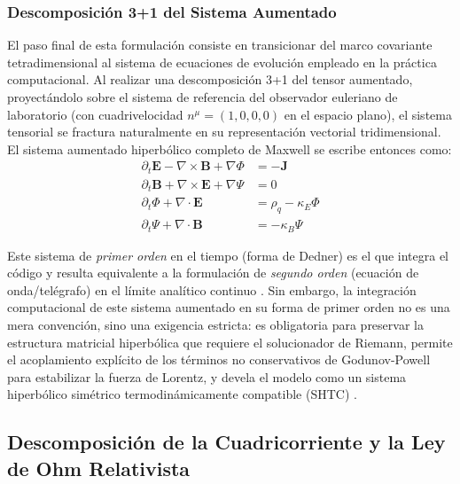 \subsubsection{Descomposición 3+1 del Sistema Aumentado}

\primerparrafo El paso final de esta formulación consiste en transicionar del marco covariante tetradimensional al sistema de ecuaciones de evolución empleado en la práctica computacional. Al realizar una descomposición 3+1 del tensor aumentado, proyectándolo sobre el sistema de referencia del observador euleriano de laboratorio (con cuadrivelocidad $n^\mu = (1, 0, 0, 0)$ en el espacio plano), el sistema tensorial se fractura naturalmente en su representación vectorial tridimensional. El sistema aumentado hiperbólico completo de Maxwell se escribe entonces como:
\begin{align}
    \partial_t \mathbf{E} - \nabla \times \mathbf{B} + \nabla \Phi &= -\mathbf{J} \label{eq:GLM_3D_E} \\
    \partial_t \mathbf{B} + \nabla \times \mathbf{E} + \nabla \Psi &= 0 \label{eq:GLM_3D_B} \\
    \partial_t \Phi + \nabla \cdot \mathbf{E} &= \rho_q - \kappa_E \Phi \label{eq:GLM_3D_Phi} \\
    \partial_t \Psi + \nabla \cdot \mathbf{B} &= -\kappa_B \Psi \label{eq:GLM_3D_Psi}
\end{align}

Este sistema de \emph{primer orden} en el tiempo (forma de Dedner) es el que integra el código y resulta equivalente a la formulación de \emph{segundo orden} (ecuación de onda/telégrafo) en el límite analítico continuo \parencite{Dedner_etal:2002}. Sin embargo, la integración computacional de este sistema aumentado en su forma de primer orden no es una mera convención, sino una exigencia estricta: es obligatoria para preservar la estructura matricial hiperbólica que requiere el solucionador de Riemann, permite el acoplamiento explícito de los términos no conservativos de Godunov-Powell para estabilizar la fuerza de Lorentz, y devela el modelo como un sistema hiperbólico simétrico termodinámicamente compatible (SHTC) \parencite{dumbser-2025}.


\subsection{Descomposición de la Cuadricorriente y la Ley de Ohm Relativista}
\label{sec:Ohm_Relativista}


